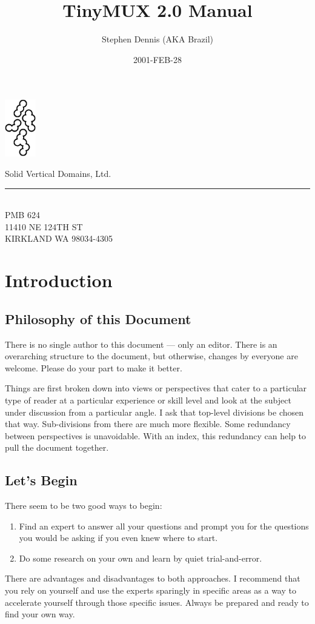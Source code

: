 \documentclass[dvips]{book}
\title{TinyMUX 2.0 Manual}
\author{Stephen Dennis (AKA Brazil)}
\date{2001-FEB-28}
\begin{document}
\frontmatter
\maketitle

\begin{minipage}[t]{0.64in}
\includegraphics[height=0.98in]{latticeS.ps}
\end{minipage}
\begin{minipage}[t]{2.75in}
\vspace{-0.90in}
\LARGE{Solid Vertical Domains, Ltd.}\\
\rule{2.75in}{0.02in} \\
\normalsize PMB 624\\
11410 NE 124TH ST\\
KIRKLAND WA 98034-4305
\end{minipage}

\mainmatter
\chapter{Introduction}
\section{Philosophy of this Document}
There is no single author to this document --- only an editor. There is an
overarching structure to the document, but otherwise, changes by everyone are
welcome. Please do your part to make it better.

Things are first broken down into views or perspectives that cater to a
particular type of reader at a particular experience or skill level and look
at the subject under discussion from a particular angle. I ask that top-level
divisions be chosen that way. Sub-divisions from there are much more flexible.
Some redundancy between perspectives is unavoidable. With an index, this
redundancy can help to pull the document together.
\section{Let's Begin}
There seem to be two good ways to begin:
\begin{enumerate}
\item
Find an expert to answer all your questions and prompt you for the questions
you would be asking if you even knew where to start.
\item
Do some research on your own and learn by quiet trial-and-error.
\end{enumerate}
There are advantages and disadvantages to both approaches. I recommend that
you rely on yourself and use the experts sparingly in specific areas as a way
to accelerate yourself through those specific issues. Always be prepared and
ready to find your own way.
\end{document}
